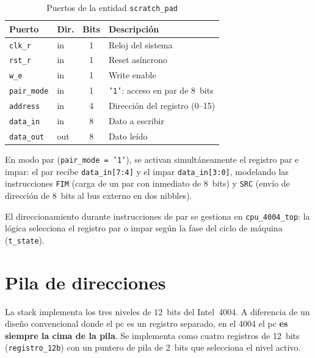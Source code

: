 \documentclass[%
    school=etsisi,%
    type=pfg,%
    degree=61CI,%
]{upm-report}
\newcommand{\vhdlfile}[1]{%
    \par\noindent{\small\sffamily\color{gray}Fichero: \texttt{#1}}\par\smallskip
}
\begin{document}
\begin{table}[H]
\centering
\caption{Puertos de la entidad \texttt{scratch\_pad}}
\label{tab:scratchpad}
\begin{tabularx}{\textwidth}{@{}llcX@{}}
\toprule
\textbf{Puerto}     & \textbf{Dir.} & \textbf{Bits} & \textbf{Descripción} \\
\midrule
\texttt{clk\_r}     & in  & 1 & Reloj del sistema \\
\texttt{rst\_r}     & in  & 1 & Reset asíncrono \\
\texttt{w\_e}       & in  & 1 & Write enable \\
\texttt{pair\_mode} & in  & 1 & \texttt{'1'}: acceso en par de 8~bits \\
\texttt{address}    & in  & 4 & Dirección del registro (0--15) \\
\texttt{data\_in}   & in  & 8 & Dato a escribir \\
\texttt{data\_out}  & out & 8 & Dato leído \\
\bottomrule
\end{tabularx}
\end{table}

En modo par (\texttt{pair\_mode = '1'}), se activan simultáneamente el
registro par e impar: el par recibe \texttt{data\_in[7:4]} y el impar
\texttt{data\_in[3:0]}, modelando las instrucciones \texttt{FIM} (carga de
un par con inmediato de 8~bits) y \texttt{SRC} (envío de dirección de 8~bits
al bus externo en dos \glspl{nibble}).

El direccionamiento durante instrucciones de par se gestiona en
\texttt{cpu\_4004\_top}: la lógica selecciona el registro par o impar según
la fase del ciclo de máquina (\texttt{t\_state}).

\section{Pila de direcciones}
\label{s:stack}

\vhdlfile{stack\_3L.vhd}

La \gls{stack} implementa los tres niveles de 12~bits del Intel~4004.  A
diferencia de un diseño convencional donde el \acrshort{pc} es un registro
separado, en el 4004 el \acrshort{pc} \textbf{es siempre la cima de la pila}.
Se implementa como cuatro registros de 12~bits (\texttt{registro\_12b}) con
un puntero de pila de 2~bits que selecciona el nivel activo.
\end{document}

